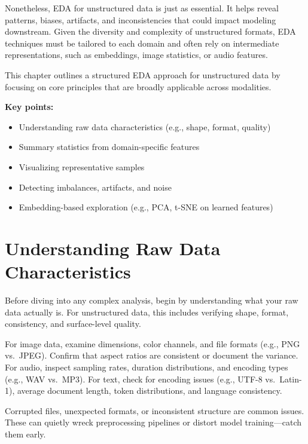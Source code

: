 \documentclass[12pt,openany]{book}
\begin{document}
Nonetheless, EDA for unstructured data is just as essential. It helps 
reveal patterns, biases, artifacts, and inconsistencies that could 
impact modeling downstream. Given the diversity and complexity of 
unstructured formats, EDA techniques must be tailored to each domain 
and often rely on intermediate representations, such as embeddings, 
image statistics, or audio features. \newline

This chapter outlines a structured EDA approach for unstructured data 
by focusing on core principles that are broadly applicable across 
modalities.
\newline

\textbf{Key points:}
\begin{itemize}
    \item Understanding raw data characteristics (e.g., shape, format, quality)
    \item Summary statistics from domain-specific features 
    \item Visualizing representative samples
    \item Detecting imbalances, artifacts, and noise
    \item Embedding-based exploration (e.g., PCA, t-SNE on learned features)
\end{itemize}


\section{Understanding Raw Data Characteristics}

Before diving into any complex analysis, begin by understanding what your raw data actually is. For unstructured data, this includes verifying shape, format, consistency, and surface-level quality.
\newline

For image data, examine dimensions, color channels, and file formats (e.g., PNG vs.\ JPEG). Confirm that aspect ratios are consistent or document the variance. For audio, inspect sampling rates, duration distributions, and encoding types (e.g., WAV vs.\ MP3). For text, check for encoding issues (e.g., UTF-8 vs.\ Latin-1), average document length, token distributions, and language consistency.
\newline

Corrupted files, unexpected formats, or inconsistent structure are common issues. These can quietly wreck preprocessing pipelines or distort model training—catch them early.
\newline
\end{document}
